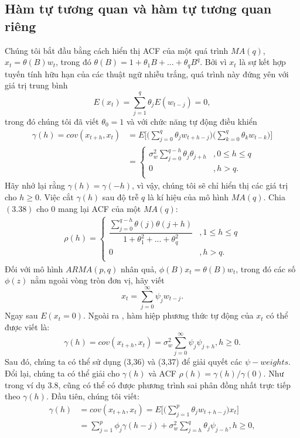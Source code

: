 \documentclass[12pt, a4paper,oneside]{book}
\theoremstyle{definition}
\begin{document}
\subsection{Hàm tự tương quan và hàm tự tương quan riêng}
Chúng tôi bắt đầu bằng cách hiển thị ACF của một quá trình $MA(q)$, $x_{t}=\theta(B)w_{t}$, trong đó $\theta(B)=1+\theta_{1}B+...+\theta_{q}B^{q}$. Bởi vì $x_{t}$ là sự kết hợp tuyến tính hữu hạn của các thuật ngữ nhiễu trắng, quá trình này đứng yên với giá trị trung bình
$$E(x_{t})= \displaystyle\sum_{j=1}^q \theta_{j}E(w_{t-j})=0,$$ 
trong đó chúng tôi đã viết $\theta_{0}=1$ và với chức năng tự động điều khiển
\begin{align*}
	\gamma(h)= cov (x_{t+h},x_{t}) & = E\Bigg[\bigg(\displaystyle\sum_{j=0}^{q} \theta_{j}w_{t+h-j}\bigg)\bigg(\displaystyle\sum_{k=0}^{q} \theta_{k}w_{t-k}\bigg)\Bigg]\\	
	&=\begin{cases} 
	\sigma_w^{2}\displaystyle\sum_{j=0}^{q-h}\theta_{j}\theta_{j+h}&, 0\leq h\leq q \\
    0&, h>q. \\
	\end{cases}
\end{align*}
Hãy nhớ lại rằng $\gamma(h)=\gamma(-h)$, vì vậy, chúng tôi sẽ chỉ hiển thị các giá trị cho $h\geq 0$. Việc cắt $\gamma(h)$ sau độ trễ $q$ là kí hiệu của mô hình $MA(q)$. Chia  $(3.38)$ cho 0 mang lại ACF của một $MA(q)$:
\begin{align*}
\rho(h) =
\begin{cases} 
\dfrac{\displaystyle\sum_{j=0}^{q-h}\theta(j)\theta(j+h)}{1+\theta_1^{2}+...+\theta_q^{2}}&, 1 \leq h \leq q\\ 
0&, h > q.\\
\end{cases}
\end{align*}
Đối với mô hình $ARMA(p,q)$ nhân quả, $\phi(B)x_{t}=\theta(B)w_{t}$, trong đó các số $\phi(z)$ nằm ngoài vòng tròn đơn vị, hãy viết
$$x_{t}=\displaystyle\sum_{j=0}^{\infty}\psi_{j}w_{t-j}.$$
Ngay sau $E(x_{t}=0)$. Ngoài ra , hàm hiệp phương thức tự động của $x_{t}$ có thể được viết là:
$$\gamma(h)= cov (x_{t+h},x_{t})= \sigma_w^{2}\displaystyle\sum_{j=0}^{\infty}\psi_{j}\psi_{j+h}, h \geq 0.$$
Sau đó, chúng ta có thể sử dụng (3,36) và (3,37) để giải quyết các $\psi-weights$. Đổi lại, chúng ta có thể giải cho $\gamma(h)$ và ACF $\rho(h)=\gamma(h)/\gamma(0).$ Như trong ví dụ 3.8, cũng có thể có được phương trình sai phân đồng nhất trực tiếp theo $\gamma(h)$. Đầu tiên, chúng tôi viết:
\begin{align*}
\gamma(h) & = cov (x_{t+h},x_{t}) = E\Bigg[\bigg(\displaystyle\sum_{j=1}^{p} \theta_{j}w_{t+h-j}\bigg)x_{t}\Bigg]\\
&  = \displaystyle\sum_{j=1}^{p}\phi_{j}\gamma(h-j)+\sigma_w^{2}\displaystyle\sum_{j=h}^{q}\theta_{j}\psi_{j-h}, h \geq 0,\\
\end{align*}
\end{document}
